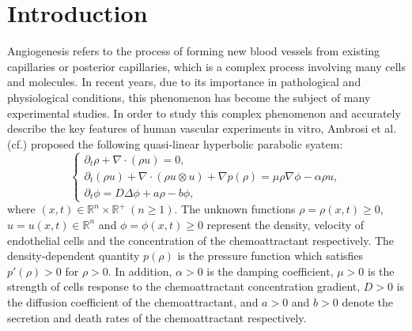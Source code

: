 \documentclass[11pt]{article}
\theoremstyle{plain}
\numberwithin{equation}{section}
\begin{document}
	\section{Introduction}\label{sec1}
		Angiogenesis refers to the process of forming new blood vessels from existing capillaries or posterior capillaries, which is a complex process involving many cells and molecules. 
In recent years, due to its importance in pathological and physiological conditions, this phenomenon has become the subject of many experimental studies. 
In order to study this complex phenomenon and accurately describe the key features of human vascular experiments in vitro, Ambrosi et al. (cf.\cite{Ambrosi1, Ambrosi2}) proposed the following quasi-linear hyperbolic parabolic syatem:
	\begin{equation}\label{sanweiqngxing}
	\left\{
	\begin{array}{lr}
		\partial_t\rho+\nabla\cdot\left(\rho u\right)=0, \\[2mm]
	\partial_t\left(\rho u\right)+\nabla\cdot\left(\rho u\otimes u\right)+\nabla p(\rho)=\mu\rho\nabla\phi-\alpha\rho u,\\[2mm]
	\partial_t\phi=D\Delta\phi+a\rho-b\phi,
	\end{array}
	\right.
\end{equation}
	where $(x,t) \in \mathbb{R}^n\times \mathbb{R}^+ ~ (n\geq 1)$.  
	The unknown functions  $\rho=\rho(x,t)\geq0$, $u=u(x,t) \in \mathbb{R}^n$ and $ \phi=\phi(x,t)\geq0$ represent the density, velocity of endothelial cells and the concentration of the chemoattractant respectively.
	 The density-dependent quantity $p(\rho)$ is the pressure function which satisfies $p'(\rho)>0$ for $\rho>0$.
	In addition, $\alpha>0$ is the damping coefficient, $\mu>0$ is the strength of cells response to the chemoattractant concentration gradient, $D>0$ is the diffusion coefficient of the chemoattractant, and $a>0$ and $b>0$ denote the secretion and death rates of the chemoattractant respectively.
	
\end{document}
